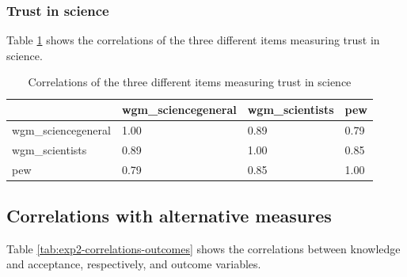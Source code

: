 \documentclass[
  doc,floatsintext]{apa6}
\begin{document}
\subsubsection{Trust in science}\label{trust-in-science-5}

Table \ref{tab:exp2-correlation-trust} shows the correlations of the three different items measuring trust in science.

\begin{table}[h]

\begin{center}
\begin{threeparttable}

\caption{\label{tab:exp2-correlation-trust}Correlations of the three different items measuring trust in science}

\begin{tabular}{llll}
\toprule
 & \multicolumn{1}{c}{wgm\_sciencegeneral} & \multicolumn{1}{c}{wgm\_scientists} & \multicolumn{1}{c}{pew}\\
\midrule
wgm\_sciencegeneral & 1.00 & 0.89 & 0.79\\
wgm\_scientists & 0.89 & 1.00 & 0.85\\
pew & 0.79 & 0.85 & 1.00\\
\bottomrule
\end{tabular}

\end{threeparttable}
\end{center}

\end{table}

\subsection{Correlations with alternative measures}\label{correlations-with-alternative-measures-1}

Table \ref{tab:exp2-correlations-outcomes} shows the correlations between knowledge and acceptance, respectively, and outcome variables.
\end{document}
